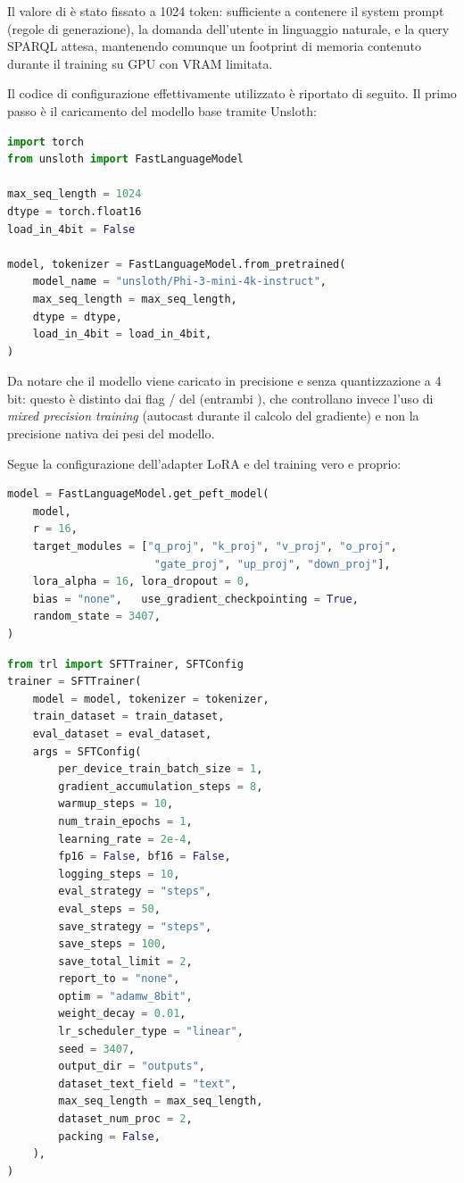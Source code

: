 Il valore di  è stato fissato a 1024 token: sufficiente a contenere il system prompt (regole di generazione), la domanda dell'utente in linguaggio naturale, e la query SPARQL attesa, mantenendo comunque un footprint di memoria contenuto durante il training su GPU con VRAM limitata.
 
Il codice di configurazione effettivamente utilizzato è riportato di seguito. Il primo passo è il caricamento del modello base tramite Unsloth:

\vfill
 
\begin{lstlisting}[language=python, caption=Caricamento del modello base]
import torch
from unsloth import FastLanguageModel
 
max_seq_length = 1024
dtype = torch.float16
load_in_4bit = False
 
model, tokenizer = FastLanguageModel.from_pretrained(
    model_name = "unsloth/Phi-3-mini-4k-instruct",
    max_seq_length = max_seq_length,
    dtype = dtype,
    load_in_4bit = load_in_4bit,
)
\end{lstlisting}
 
Da notare che il modello viene caricato in precisione  e senza quantizzazione a 4 bit: questo è distinto dai flag / del  (entrambi ), che controllano invece l'uso di \textit{mixed precision training} (autocast durante il calcolo del gradiente) e non la precisione nativa dei pesi del modello.
 
Segue la configurazione dell'adapter LoRA e del training vero e proprio:
 
\begin{lstlisting}[language=python, caption=Configurazione dell'adapter LoRA tramite Unsloth]
model = FastLanguageModel.get_peft_model(
    model,
    r = 16,
    target_modules = ["q_proj", "k_proj", "v_proj", "o_proj",
                       "gate_proj", "up_proj", "down_proj"],
    lora_alpha = 16, lora_dropout = 0,
    bias = "none",   use_gradient_checkpointing = True,
    random_state = 3407,
)
\end{lstlisting}
 
\begin{lstlisting}[language=python, caption=Configurazione del training tramite SFTTrainer (libreria TRL)]
from trl import SFTTrainer, SFTConfig
trainer = SFTTrainer(
    model = model, tokenizer = tokenizer,
    train_dataset = train_dataset,
    eval_dataset = eval_dataset,
    args = SFTConfig(
        per_device_train_batch_size = 1,
        gradient_accumulation_steps = 8,
        warmup_steps = 10,
        num_train_epochs = 1,
        learning_rate = 2e-4,
        fp16 = False, bf16 = False,
        logging_steps = 10,
        eval_strategy = "steps",
        eval_steps = 50,
        save_strategy = "steps",
        save_steps = 100,
        save_total_limit = 2,
        report_to = "none",
        optim = "adamw_8bit",
        weight_decay = 0.01,
        lr_scheduler_type = "linear",
        seed = 3407,
        output_dir = "outputs",
        dataset_text_field = "text",
        max_seq_length = max_seq_length,
        dataset_num_proc = 2,
        packing = False,
    ),
)
\end{lstlisting}


